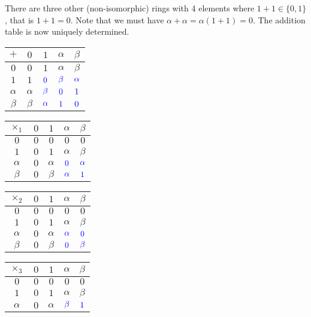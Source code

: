 \documentclass{article}
\newcommand{\add}[1]{{\color{blue} #1}}
\begin{document}
\begin{enumerate}
    There are three other (non-isomorphic) rings with 4 elements where $1 + 1\in\{0,1\}$, that is $1 + 1 = 0$. Note that we must have $\alpha + \alpha = \alpha(1+1) = 0$. The addition table is now uniquely determined.
    \begin{center}
    \begin{tabular}{c|c|c|c|c}
             $+$&$0$&$1$&$\alpha$&$\beta$  \\ \hline
             $0$&$0$&$1$&$\alpha$&$\beta$  \\ \hline
             $1$&$1$&$\add{0}$&$\add{\beta}$&$\add{\alpha}$  \\ \hline
             $\alpha$&$\alpha$&$\add{\beta}$&$\add{0}$&$\add{1}$   \\ \hline
             $\beta$&$\beta$&$\add{\alpha}$&$\add{1}$&$\add{0}$
    \end{tabular}
    \hspace{20pt}
    \begin{tabular}{c|c|c|c|c}
             $\times_1$&$0$&$1$&$\alpha$&$\beta$   \\ \hline
             $0$&$0$&$0$&$0$&$0$  \\ \hline
             $1$&$0$&$1$&$\alpha$&$\beta$   \\ \hline
             $\alpha$&$0$&$\alpha$&$\add{0}$&$\add{\alpha}$ \\ \hline
             $\beta$&$0$&$\beta$&$\add{\alpha}$&$\add{1}$
    \end{tabular}
    \hspace{10pt}
    \begin{tabular}{c|c|c|c|c}
             $\times_2$&$0$&$1$&$\alpha$&$\beta$   \\ \hline
             $0$&$0$&$0$&$0$&$0$  \\ \hline
             $1$&$0$&$1$&$\alpha$&$\beta$   \\ \hline
             $\alpha$&$0$&$\alpha$&$\add{\alpha}$&$\add{0}$ \\ \hline
             $\beta$&$0$&$\beta$&$\add{0}$&$\add{\beta}$
    \end{tabular}
    \hspace{10pt}
    \begin{tabular}{c|c|c|c|c}
             $\times_3$&$0$&$1$&$\alpha$&$\beta$   \\ \hline
             $0$&$0$&$0$&$0$&$0$  \\ \hline
             $1$&$0$&$1$&$\alpha$&$\beta$   \\ \hline
             $\alpha$&$0$&$\alpha$&$\add{\beta}$&$\add{1}$ \\ \hline

\end{tabular}
\end{center}
\end{enumerate}
\end{document}
